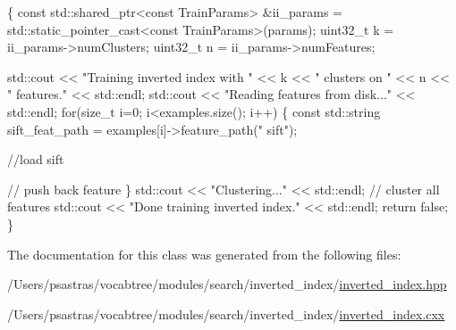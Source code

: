 \begin{DoxyCode}
                                                                               
                                                              \{
        \textcolor{keyword}{const} std::shared\_ptr<const TrainParams> &ii\_params = 
      std::static\_pointer\_cast<\textcolor{keyword}{const} TrainParams>(params);
        uint32\_t k = ii\_params->numClusters;
        uint32\_t n = ii\_params->numFeatures;

        std::cout << \textcolor{stringliteral}{"Training inverted index with "} << k << \textcolor{stringliteral}{" clusters on "} <<
       n << \textcolor{stringliteral}{" features."} << std::endl;
        std::cout << \textcolor{stringliteral}{"Reading features from disk..."} << std::endl;
        \textcolor{keywordflow}{for}(\textcolor{keywordtype}{size\_t} i=0; i<examples.size(); i++) \{
                \textcolor{keyword}{const} std::string sift\_feat\_path = examples[i]->feature\_path(\textcolor{stringliteral}{"
      sift"});
                
                \textcolor{comment}{//load sift}

                \textcolor{comment}{// push back feature}
        \}
        std::cout << \textcolor{stringliteral}{"Clustering..."} << std::endl;
        \textcolor{comment}{// cluster all features}
        std::cout << \textcolor{stringliteral}{"Done training inverted index."} << std::endl;
        \textcolor{keywordflow}{return} \textcolor{keyword}{false};
\}
\end{DoxyCode}


The documentation for this class was generated from the following files\-:\begin{DoxyCompactItemize}
\item 
/\-Users/psastras/vocabtree/modules/search/inverted\-\_\-index/\hyperlink{inverted__index_8hpp}{inverted\-\_\-index.\-hpp}\item 
/\-Users/psastras/vocabtree/modules/search/inverted\-\_\-index/\hyperlink{inverted__index_8cxx}{inverted\-\_\-index.\-cxx}\end{DoxyCompactItemize}
